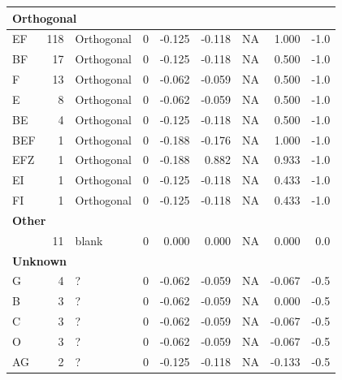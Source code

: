 \documentclass[
  letterpaper,
  DIV=11,
  numbers=noendperiod]{scrreprt}
\begin{document}
\begin{tabular}[t]{l|r|l|r|r|r|r|r|r}
\hline
\multicolumn{9}{l}{\textbf{Orthogonal}}\\
\hline
\hspace{1em}EF & 118 & Orthogonal & 0 & -0.125 & -0.118 & NA & 1.000 & -1.0\\
\hline
\hspace{1em}BF & 17 & Orthogonal & 0 & -0.125 & -0.118 & NA & 0.500 & -1.0\\
\hline
\hspace{1em}F & 13 & Orthogonal & 0 & -0.062 & -0.059 & NA & 0.500 & -1.0\\
\hline
\hspace{1em}E & 8 & Orthogonal & 0 & -0.062 & -0.059 & NA & 0.500 & -1.0\\
\hline
\hspace{1em}BE & 4 & Orthogonal & 0 & -0.125 & -0.118 & NA & 0.500 & -1.0\\
\hline
\hspace{1em}BEF & 1 & Orthogonal & 0 & -0.188 & -0.176 & NA & 1.000 & -1.0\\
\hline
\hspace{1em}EFZ & 1 & Orthogonal & 0 & -0.188 & 0.882 & NA & 0.933 & -1.0\\
\hline
\hspace{1em}EI & 1 & Orthogonal & 0 & -0.125 & -0.118 & NA & 0.433 & -1.0\\
\hline
\hspace{1em}FI & 1 & Orthogonal & 0 & -0.125 & -0.118 & NA & 0.433 & -1.0\\
\hline
\multicolumn{9}{l}{\textbf{Other}}\\
\hline
\hspace{1em} & 11 & blank & 0 & 0.000 & 0.000 & NA & 0.000 & 0.0\\
\hline
\multicolumn{9}{l}{\textbf{Unknown}}\\
\hline
\hspace{1em}G & 4 & ? & 0 & -0.062 & -0.059 & NA & -0.067 & -0.5\\
\hline
\hspace{1em}B & 3 & ? & 0 & -0.062 & -0.059 & NA & 0.000 & -0.5\\
\hline
\hspace{1em}C & 3 & ? & 0 & -0.062 & -0.059 & NA & -0.067 & -0.5\\
\hline
\hspace{1em}O & 3 & ? & 0 & -0.062 & -0.059 & NA & -0.067 & -0.5\\
\hline
\hspace{1em}AG & 2 & ? & 0 & -0.125 & -0.118 & NA & -0.133 & -0.5\\

\end{tabular}
\end{document}

